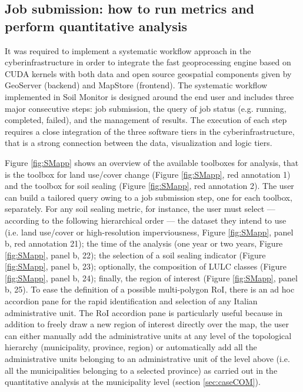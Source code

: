 \documentclass[APA,LATO1COL,doublespace]{WileyNJD-v2}
\begin{document}
\subsection{Job submission: how to run metrics and perform quantitative analysis}
\label{sec:jobsubmission}
It was required to implement a systematic workflow approach in the cyberinfrastructure in order to integrate the fast geoprocessing engine based on CUDA kernels with both data and open source geospatial components given by GeoServer (backend) and MapStore (frontend). 
The systematic workflow implemented in Soil Monitor is designed around the end user and includes three major consecutive steps: job submission, the query of job status (e.g. running, completed, failed), and the management of results.
The execution of each step requires a close integration of the three software tiers in the cyberinfrastructure, that is a strong connection between the data, visualization and logic tiers. 

Figure \ref{fig:SMapp} shows an overview of the available toolboxes for analysis, that is the toolbox for land use/cover change (Figure \ref{fig:SMapp}, red annotation 1) and the toolbox for soil sealing (Figure \ref{fig:SMapp}, red annotation 2).
The user can build a tailored query owing to a job submission step, one for each toolbox, separately. 
For any soil sealing metric, for instance, the user must select --- according to the following hierarchical order --- 
the dataset they intend to use (i.e. land use/cover or high-resolution imperviousness, Figure \ref{fig:SMapp}, panel b, red annotation 21); 
the time of the analysis (one year or two years, Figure \ref{fig:SMapp}, panel b, 22); 
the selection of a soil sealing indicator (Figure \ref{fig:SMapp}, panel b, 23); 
optionally, the composition of LULC classes (Figure \ref{fig:SMapp}, panel b, 24); 
finally, the region of interest (Figure \ref{fig:SMapp}, panel b, 25). 
To ease the definition of a possible multi-polygon RoI, there is an ad hoc accordion pane for the rapid identification and selection of any Italian administrative unit.
The RoI accordion pane is particularly useful because in addition to freely draw a new region of interest directly over the map, the user can either manually add the administrative units at any level of the topological hierarchy (municipality, province, region) 
or automatically add all the administrative units belonging to an administrative unit of the level above (i.e. all the municipalities belonging to a selected province) as carried out in the quantitative analysis at the municipality level (section \ref{sec:caseCOM}).
\end{document}
